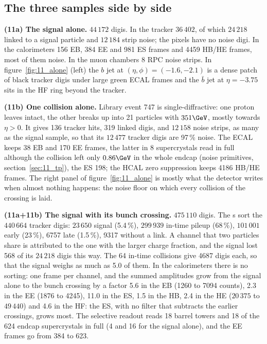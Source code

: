 \subsection{The three samples side by side}
\label{sec:11_samples}

\textbf{(11a) The signal alone.} $44\,172$ digis. In the tracker $36\,402$, of which $24\,218$ linked to a signal
particle and $12\,184$ strip noise; the pixels have no noise digi. In the calorimeters 156 EB, 384 EE and 981 ES frames
and 4459 HB/HE frames, most of them noise. In the muon chambers 8 RPC noise strips. In figure~\ref{fig:11_alone} (left)
the $b$ jet at $(\eta,\phi)=(-1.6,-2.1)$ is a dense patch of black tracker digis under large green ECAL frames and the
$\bar b$ jet at $\eta=-3.75$ sits in the HF ring beyond the tracker.

\textbf{(11b) One collision alone.} Library event 747 is single-diffractive: one proton leaves intact, the other
breaks up into 21 particles with $351\GeV$, mostly towards $\eta>0$. It gives 136 tracker hits, 319 linked digis, and
$12\,158$ noise strips, as many as the signal sample, so that its $12\,477$ tracker digis are 97\,\% noise. The ECAL
keeps 38 EB and 170 EE frames, the latter in 8 supercrystals read in full although the collision left only $0.86\GeV$
in the whole endcap (noise primitives, section~\ref{sec:11_tp}), the ES 198; the HCAL zero suppression keeps 4186 HB/HE
frames. The right panel of figure~\ref{fig:11_alone} is mostly what the detector writes when almost nothing happens:
the noise floor on which every collision of the crossing is laid.

\textbf{(11a+11b) The signal with its bunch crossing.} $475\,110$ digis. The s sort the $440\,664$ tracker
digis: $23\,650$ signal (5.4\,\%), $299\,939$ in-time pileup (68\,\%), $101\,001$ early (23\,\%), 6757 late (1.5\,\%),
9317 without a link. A channel that two particles share is attributed to the one with the larger charge fraction, and
the signal lost 568 of its $24\,218$ digis this way. The 64 in-time collisions give 4687 digis each, so that the signal
weighs as much as 5.0 of them. In the calorimeters there is no sorting: one frame per channel, and the summed
amplitudes grow from the signal alone to the bunch crossing by a factor 5.6 in the EB (1260 to 7094 counts), 2.3 in the
EE (1876 to 4245), 11.0 in the ES, 1.5 in the HB, 2.4 in the HE ($20\,375$ to $49\,440$) and 4.6 in the HF: the ES, with
no filter that subtracts the earlier crossings, grows most. The selective readout reads 18 barrel towers and 18 of the
624 endcap supercrystals in full (4 and 16 for the signal alone), and the EE frames go from 384 to 623.

